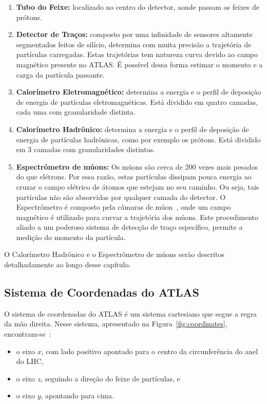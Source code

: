 \begin{enumerate}
    \item {\bf Tubo do Feixe:} localizado no centro do detector, aonde passam os
    feixes de prótons.
    \item {\bf Detector de Traços:} composto por uma infinidade de sensores
    altamente segmentados feitos de silício, determina com muita precisão a
    trajetória de partículas carregadas. Estas trajetórias tem natureza curva devido
    ao campo magnético presente no ATLAS. É possível dessa forma estimar o
    momento e a carga da partícula passante.
    \item {\bf Calorímetro Eletromagnético:} determina a energia e o perfil de
    deposição de energia de partículas eletromagnéticas. Está dividido em quatro
    camadas, cada uma com granularidade distinta.
    \item {\bf Calorímetro Hadrônico:} determina a energia e o perfil de
    deposição de energia de partículas hadrônicas, como por exemplo os prótons.
    Está dividido em 3 camadas  com granularidades distintas.
    \item {\bf Espectrômetro de múons:} Os múons são cerca de 200 vezes mais
    pesados do que elétrons. Por essa razão, estas partículas dissipam pouca
    energia ao cruzar o campo elétrico de átomos que estejam no seu caminho.
    Ou seja, tais partículas não são absorvidas por qualquer camada do
    detector.
    O Espectrômetro é composto pela câmaras de múon~\cite{ref:atlas2009}, onde
    um campo magnético é utilizado para curvar a trajetória dos múons. Este
    procedimento aliado a um poderoso sistema de detecção de traço específico,
    permite a medição do momento da partícula.

\end{enumerate}

O Calorímetro Hadrônico e o Espectrômetro de múons serão descritos
detalhadamente ao longo desse capítulo.

\subsection[Sistema de Coordenadas]{Sistema de Coordenadas do ATLAS}

O sistema de coordenadas do ATLAS é um sistema cartesiano que segue a regra da
mão direita. Nesse sistema, apresentado na Figura~\ref{fig:coordinates},
encontram-se~\cite{EGEDE1998}:


\begin{itemize}
    \item o eixo $x$, com lado positivo apontado para o centro da
    circunferência do anel do LHC,
    \item o eixo $z$, seguindo a direção do feixe de partículas, e
    \item o eixo $y$, apontando para cima.
\end{itemize}

